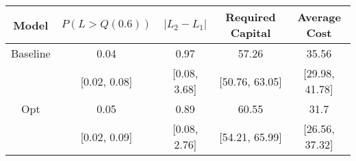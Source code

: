 \begin{tabular}{ccccc}
\toprule
   Model & $P(L > Q(0.6))$ & $|L_2 - L_1|$ & Required Capital &   Average Cost \\
\midrule
Baseline &            0.04 &          0.97 &            57.26 &          35.56 \\
         &    [0.02, 0.08] &  [0.08, 3.68] &   [50.76, 63.05] & [29.98, 41.78] \\
     Opt &            0.05 &          0.89 &            60.55 &           31.7 \\
         &    [0.02, 0.09] &  [0.08, 2.76] &   [54.21, 65.99] & [26.56, 37.32] \\
\bottomrule
\end{tabular}
